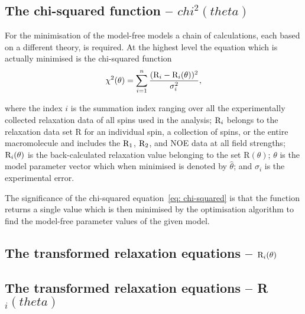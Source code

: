 \begin{htmlonly}
    \subsection{The chi-squared function -- $chi^2(theta)$}
\begin{htmlonly}


For the minimisation of the model-free models a chain of calculations, each based on a different theory, is required.  At the highest level the equation which is actually minimised is the chi-squared function
\begin{equation} \label{eq: chi-squared}
 \chi^2(\theta) = \sum_{i=1}^n \frac{(\mathrm{R}_i - \mathrm{R}_i(\theta))^2}{\sigma_i^2},
\end{equation}

\noindent where the index $i$ is the summation index ranging over all the experimentally collected relaxation data of all spins used in the analysis; $\mathrm{R}_i$ belongs to the relaxation data set R for an individual spin, a collection of spins, or the entire macromolecule and includes the $\mathrm{R}_1$, $\mathrm{R}_2$, and NOE data at all field strengths; $\mathrm{R}_i(\theta)$ is the back-calculated relaxation value belonging to the set R$(\theta)$; $\theta$ is the model parameter vector which when minimised is denoted by $\hat\theta$; and $\sigma_i$ is the experimental error.

The significance of the chi-squared equation~\eqref{eq: chi-squared} is that the function returns a single value which is then minimised by the optimisation algorithm to find the model-free parameter values of the given model.



\begin{latexonly}
    \subsection{The transformed relaxation equations -- $\mathrm{R}_i(\theta)$}
\end{latexonly}
\begin{htmlonly}
    \subsection{The transformed relaxation equations -- R$_i(theta)$}
\end{htmlonly}


\end{htmlonly}
\end{htmlonly}
